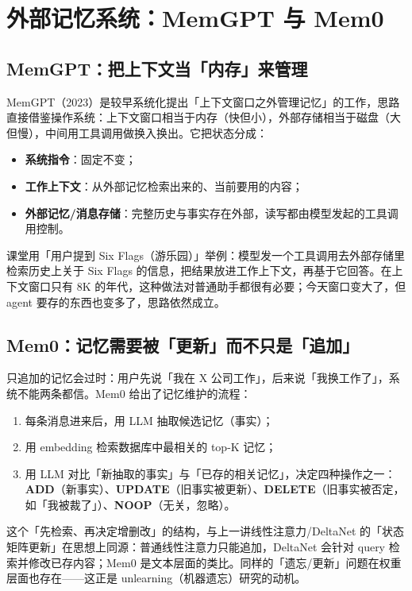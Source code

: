 ﻿\documentclass[a4paper]{article}
\begin{document}
\section{外部记忆系统：MemGPT 与 Mem0}

\subsection{MemGPT：把上下文当「内存」来管理}

MemGPT（2023）是较早系统化提出「上下文窗口之外管理记忆」的工作，思路直接借鉴操作系统：上下文窗口相当于内存（快但小），外部存储相当于磁盘（大但慢），中间用工具调用做换入换出。它把状态分成：

\begin{itemize}
\item \textbf{系统指令}：固定不变；
\item \textbf{工作上下文}：从外部记忆检索出来的、当前要用的内容；
\item \textbf{外部记忆/消息存储}：完整历史与事实存在外部，读写都由模型发起的工具调用控制。
\end{itemize}

课堂用「用户提到 Six Flags（游乐园）」举例：模型发一个工具调用去外部存储里检索历史上关于 Six Flags 的信息，把结果放进工作上下文，再基于它回答。在上下文窗口只有 8K 的年代，这种做法对普通助手都很有必要；今天窗口变大了，但 agent 要存的东西也变多了，思路依然成立。

\subsection{Mem0：记忆需要被「更新」而不只是「追加」}

只追加的记忆会过时：用户先说「我在 X 公司工作」，后来说「我换工作了」，系统不能两条都信。Mem0 给出了记忆维护的流程：

\begin{enumerate}
\item 每条消息进来后，用 LLM 抽取候选记忆（事实）；
\item 用 embedding 检索数据库中最相关的 top-K 记忆；
\item 用 LLM 对比「新抽取的事实」与「已存的相关记忆」，决定四种操作之一：
  \textbf{ADD}（新事实）、\textbf{UPDATE}（旧事实被更新）、\textbf{DELETE}（旧事实被否定，如「我被裁了」）、\textbf{NOOP}（无关，忽略）。
\end{enumerate}

这个「先检索、再决定增删改」的结构，与上一讲线性注意力/DeltaNet 的「状态矩阵更新」在思想上同源：普通线性注意力只能追加，DeltaNet 会针对 query 检索并修改已存内容；Mem0 是文本层面的类比。同样的「遗忘/更新」问题在权重层面也存在——这正是 unlearning（机器遗忘）研究的动机。
\end{document}
